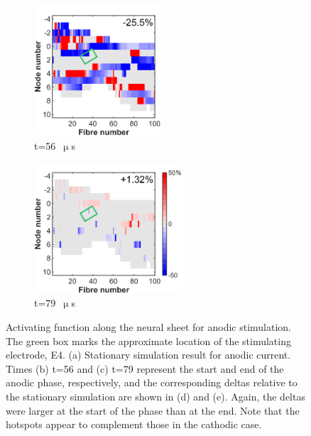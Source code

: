 \begin{figure}
\begin{subfigure}[t]{0.32\textwidth}
        \phantom{\hspace{4.96cm}}
    \end{subfigure}%
    \begin{subfigure}[t]{0.32\textwidth}
        \centering
        \includegraphics[height=4.85cm]{Simulations/TimeDep/anodDelta_AF-term4-hemi_gnd-t56_-25p454RMS}
        \caption{t=56~$ \upmu $s}
        \label{fig:af_delta_t56}
    \end{subfigure}%
    \begin{subfigure}[t]{0.36\textwidth}
        \centering
        \includegraphics[height=4.85cm]{Simulations/TimeDep/anodDelta_AF-term4-hemi_gnd-t79_1p319RMS}
        \caption{t=79~$ \upmu $s}
        \label{fig:af_delta_t79}
    \end{subfigure}%
    
	\caption[Activating function along the neural sheet (anodic)]{Activating
	function along the neural sheet for anodic stimulation. The green box marks
	the approximate location of the stimulating electrode, E4. (a) Stationary
	simulation result for anodic current. Times (b) t=56 and (c) t=79 represent
	the start and end of the anodic phase, respectively, and the corresponding
	deltas relative to the stationary simulation are shown in (d) and (e). Again,
	the deltas were larger at the start of the phase than at the end. Note that
	the hotspots appear to complement those in the cathodic case.}
	\label{fig:af_anodic_comparison}
\end{figure}

